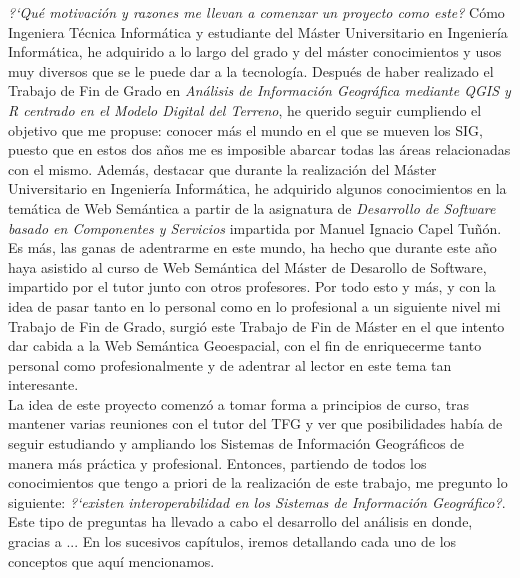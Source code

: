 \textit{?`Qué motivación y razones me llevan a comenzar un proyecto como este?} Cómo Ingeniera Técnica Informática y estudiante del Máster Universitario en Ingeniería Informática, he adquirido a lo largo del grado y del máster conocimientos y usos muy diversos que se le puede dar a la tecnología. Después de haber realizado el Trabajo de Fin de Grado en \textit{Análisis de Información Geográfica mediante QGIS y R centrado en el Modelo Digital del Terreno}, he querido seguir cumpliendo el objetivo que me propuse: conocer más el mundo en el que se mueven los SIG, puesto que en estos dos años me es imposible abarcar todas las áreas relacionadas con el mismo. Además, destacar que durante la realización del Máster Universitario en Ingeniería Informática, he adquirido algunos conocimientos en la temática de Web Semántica a partir de la asignatura de \textit{Desarrollo de Software basado en Componentes y Servicios} impartida por Manuel Ignacio Capel Tuñón. Es más, las ganas de adentrarme en este mundo, ha hecho que durante este año haya asistido al curso de Web Semántica del Máster de Desarollo de Software, impartido por el tutor junto con otros profesores. Por todo esto y más, y con la idea de pasar tanto en lo personal como en lo profesional a un siguiente nivel mi Trabajo de Fin de Grado, surgió este Trabajo de Fin de Máster en el que intento dar cabida a la Web Semántica Geoespacial, con el fin de enriquecerme tanto personal como profesionalmente y de adentrar al lector en este tema tan interesante.\\ 



La idea de este proyecto comenzó a tomar forma a principios de curso, tras mantener varias reuniones con el tutor del TFG y ver que posibilidades había de seguir estudiando y ampliando los Sistemas de Información Geográficos de manera más práctica y profesional. Entonces, partiendo de todos los conocimientos que tengo a priori de la realización de este trabajo, me pregunto lo siguiente: \textit{?`existen interoperabilidad en los Sistemas de Información Geográfico?}. Este tipo de preguntas ha llevado a cabo el desarrollo del análisis en donde, gracias a ... En los sucesivos capítulos, iremos detallando cada uno de los conceptos que aquí mencionamos.


